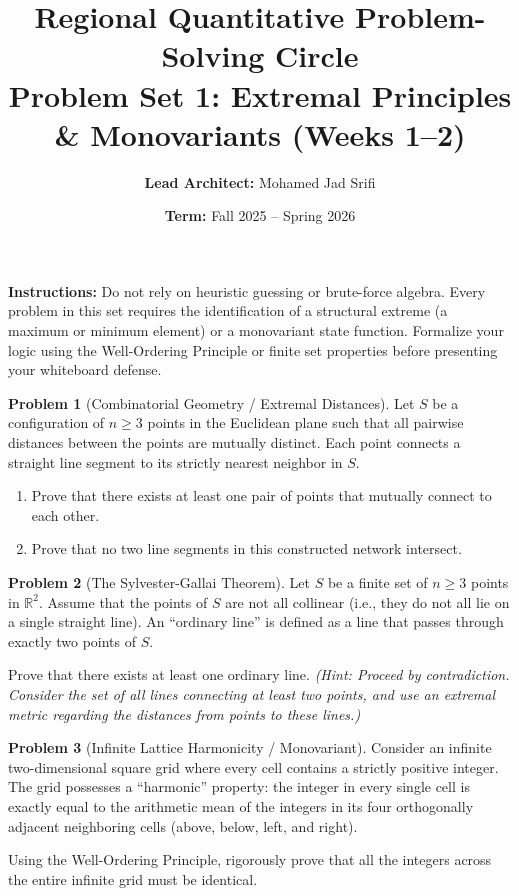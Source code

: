 \documentclass[11pt, a4paper]{article}
\theoremstyle{definition}
\newtheorem{problem}{Problem}
\begin{document}
\title{\vspace{-1.5cm}\textbf{Regional Quantitative Problem-Solving Circle} \\ \Large Problem Set 1: Extremal Principles \& Monovariants (Weeks 1--2)}
\author{\textbf{Lead Architect:} Mohamed Jad Srifi}
\date{\textbf{Term:} Fall 2025 -- Spring 2026}
\maketitle

\noindent\textbf{Instructions:} Do not rely on heuristic guessing or brute-force algebra. Every problem in this set requires the identification of a structural extreme (a maximum or minimum element) or a monovariant state function. Formalize your logic using the Well-Ordering Principle or finite set properties before presenting your whiteboard defense.

\vspace{0.5cm}

\begin{problem}[Combinatorial Geometry / Extremal Distances]
Let $S$ be a configuration of $n \ge 3$ points in the Euclidean plane such that all pairwise distances between the points are mutually distinct. Each point connects a straight line segment to its strictly nearest neighbor in $S$. 
\begin{enumerate}
    \item Prove that there exists at least one pair of points that mutually connect to each other.
    \item Prove that no two line segments in this constructed network intersect.
\end{enumerate}
\end{problem}

\vspace{0.5cm}

\begin{problem}[The Sylvester-Gallai Theorem]
Let $S$ be a finite set of $n \ge 3$ points in $\mathbb{R}^2$. Assume that the points of $S$ are not all collinear (i.e., they do not all lie on a single straight line). An ``ordinary line'' is defined as a line that passes through exactly two points of $S$. 

Prove that there exists at least one ordinary line. 
\textit{(Hint: Proceed by contradiction. Consider the set of all lines connecting at least two points, and use an extremal metric regarding the distances from points to these lines.)}
\end{problem}

\vspace{0.5cm}

\begin{problem}[Infinite Lattice Harmonicity / Monovariant]
Consider an infinite two-dimensional square grid where every cell contains a strictly positive integer. The grid possesses a ``harmonic'' property: the integer in every single cell is exactly equal to the arithmetic mean of the integers in its four orthogonally adjacent neighboring cells (above, below, left, and right).

Using the Well-Ordering Principle, rigorously prove that all the integers across the entire infinite grid must be identical.
\end{problem}
\end{document}
